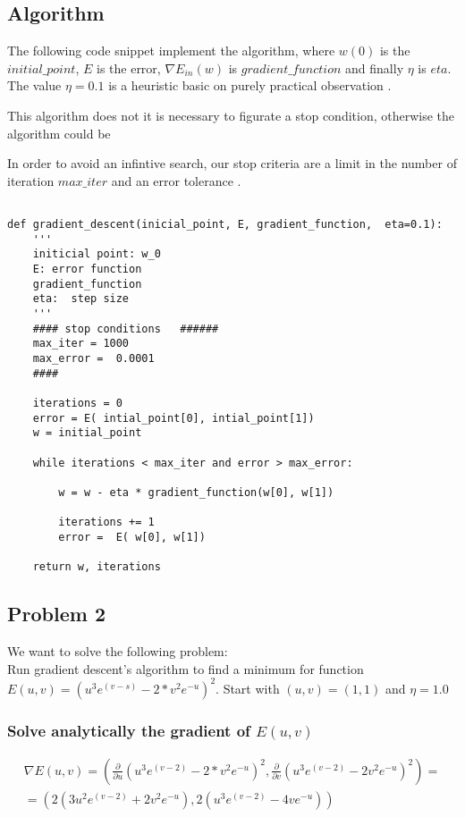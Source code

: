 \subsection{Algorithm}

The following code snippet implement the algorithm, where $w(0)$ is the $initial\_point$, $E$ is the error, $\nabla E_{in}(w)$ is $gradient\_function$ and
finally $\eta$ is $eta.$ The value $\eta = 0.1$ is a heuristic basic on purely practical observation \cite{LFD}.

This algorithm does not  it is necessary to figurate a stop condition, otherwise the algorithm could be

In order to avoid an infintive search, our stop criteria are a limit in the number of iteration $max\_iter$ and an error tolerance . 

\begin{verbatim}

def gradient_descent(inicial_point, E, gradient_function,  eta=0.1):
    '''
    initicial point: w_0 
    E: error function 
    gradient_function
    eta:  step size 
    '''
    #### stop conditions   ######
    max_iter = 1000
    max_error =  0.0001
    ####

    iterations = 0
    error = E( intial_point[0], intial_point[1])
    w = initial_point

    while iterations < max_iter and error > max_error:

        w = w - eta * gradient_function(w[0], w[1])

        iterations += 1
        error =  E( w[0], w[1])
    
    return w, iterations   
\end{verbatim}

\subsection{Problem 2 }

We want to solve the following problem: \\

Run gradient descent's algorithm to find a minimum for
function $E(u,v) = (u^3 e^{(v-s)} - 2* v^2 e^{-u})^2.$
Start with $(u,v)=(1,1)$ and $\eta = 1.0$


\subsubsection{Solve analytically the gradient of $E(u,v)$}


\begin{multline*}
  \nabla E(u,v) = \left( \frac{\partial}{\partial u}(u^3 e^{(v-2)} - 2* v^2 e^{-u})^2 , \frac{\partial}{\partial v} (u^3 e^{(v-2)} - 2 v^2 e^{-u})^2 \right) = \\
 =  \left(2(3u^2e^{(v-2)} + 2 v^2 e^{-u} ), 2(u^3 e^{(v-2)} - 4 v e^{-u}) \right)
\end{multline*}
